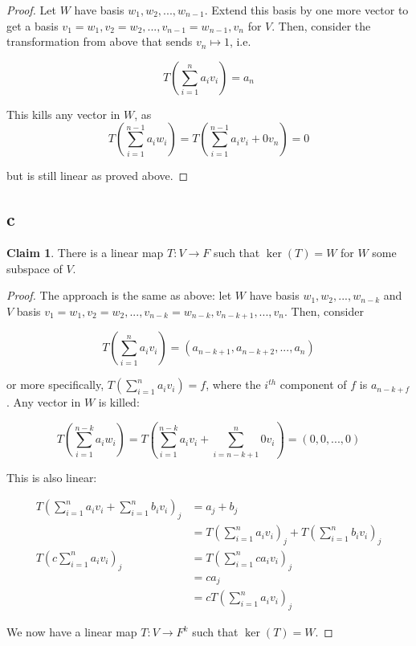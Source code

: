 \documentclass[12pt,letterpaper]{article}
\theoremstyle{definition}
\newtheorem*{claim}{Claim}
\begin{document}
\begin{proof}
  Let $W$ have basis $w_1, w_2, ..., w_{n-1}$. Extend this basis by one more
  vector to get a basis $v_1 = w_1, v_2 = w_2 , ..., v_{n-1} = w_{n-1}, v_n$ for
  $V$. Then, consider the transformation from above that sends $v_n \mapsto 1$,
  i.e. 

  \[
    T(\sum_{i=1}^n a_iv_i) = a_n
  \]

  This kills any vector in $W$, as
  \[
    T(\sum_{i=1}^{n-1} a_iw_i) = T(\sum_{i=1}^{n-1}a_iv_i + 0v_n) = 0
  \]

  but is still linear as proved above.
\end{proof}

\subsection*{c}

\begin{claim}
  There is a linear map $T: V \rightarrow F$ such that $\ker(T) = W$ for $W$
  some subspace of $V$.
\end{claim}

\begin{proof}
  The approach is the same as above: let $W$ have basis $w_1, w_2, ..., w_{n-k}$
  and $V$ basis $v_1 = w_1, v_2 = w_2, ..., v_{n-k} = w_{n-k}, v_{n - k + 1}, ...,
  v_n$. Then, consider

  \[
    T(\sum_{i=1}^{n} a_iv_i) = (a_{n-k+1}, a_{n-k + 2}, ..., a_{n})
  \]

  or more specifically, $T(\sum_{i=1}^{n} a_iv_i) = f$, where the $i^{th}$
  component of $f$ is $a_{n - k + f}$. Any vector in $W$ is killed:

  \[
    T(\sum_{i=1}^{n-k}a_iw_i) = T(\sum_{i=1}^{n-k}a_iv_i + \sum_{i=n-k +
      1}^{n}0 v_i) = (0, 0, ..., 0)
  \]

  This is also linear:

  \begin{align*}
    T(\sum_{i=1}^{n} a_iv_i + \sum_{i=1}^{n} b_iv_i)_j &= a_j + b_j \\
                                                       &= T(\sum_{i=1}^{n} a_iv_i)_j + T(\sum_{i=1}^{n} b_iv_i)_j \\
    T(c\sum_{i=1}^{n} a_iv_i)_j &= T(\sum_{i=1}^{n} ca_iv_i)_j \\
                                                       &= ca_j \\
                                                       &= cT(\sum_{i=1}^{n} a_iv_i)_j
  \end{align*}

  We now have a linear map $T: V \rightarrow F^k$ such that $\ker(T) = W$.
\end{proof}
\end{document}
